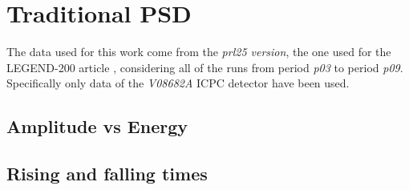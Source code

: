 \chapter{Traditional \ac{PSD}}
The data used for this work come from the \textit{prl25 version}, the one used for the LEGEND-200 article \cite{L200-sep25}, considering all of the runs from period \textit{p03} to period \textit{p09}. Specifically only data of the \textit{V08682A} ICPC detector have been used.\section{Amplitude vs Energy}
\section{Rising and falling times}